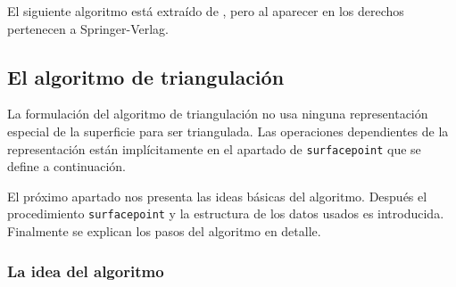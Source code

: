 \begin{remark}
	El siguiente algoritmo está extraído de \cite{Hartmann03}, pero al aparecer en \cite{Hartmann98} los derechos pertenecen a Springer-Verlag.
\end{remark}

\subsection{El algoritmo de triangulación}

La formulación del algoritmo de triangulación no usa ninguna representación especial de la superficie para ser triangulada. Las operaciones dependientes de la representación están implícitamente en el apartado de \texttt{surfacepoint} que se define a continuación.
\par El próximo apartado nos presenta las ideas básicas del algoritmo. Después el procedimiento \texttt{surfacepoint} y la estructura de los datos usados es introducida. Finalmente se explican los pasos del algoritmo en detalle.

\subsubsection{La idea del algoritmo}

